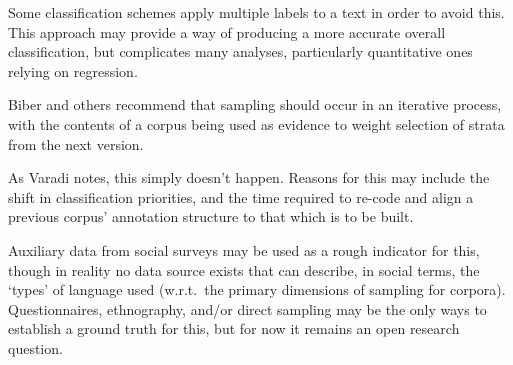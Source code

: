 Some classification schemes apply multiple labels to a text in order to avoid this\cite{sharoffs2015}.  This approach may provide a way of producing a more accurate overall classification, but complicates many analyses, particularly quantitative ones relying on regression.

Biber and others\cite{leech2006new,biber1993representativeness} recommend that sampling should occur in an iterative process, with the contents of a corpus being used as evidence to weight selection of strata from the next version.

As Varadi\cite{varadi2000corpus,varadi2001linguistic} notes, this simply doesn't happen.  Reasons for this may include the shift in classification priorities, and the time required to re-code and align a previous corpus' annotation structure to that which is to be built. 



Auxiliary data from social surveys may be used as a rough indicator for this, though in reality no data source exists that can describe, in social terms, the `types' of language used (w.r.t.\ the primary dimensions of sampling for corpora).  Questionnaires, ethnography, and/or direct sampling may be the only ways to establish a ground truth for this, but for now it remains an open research question.%









